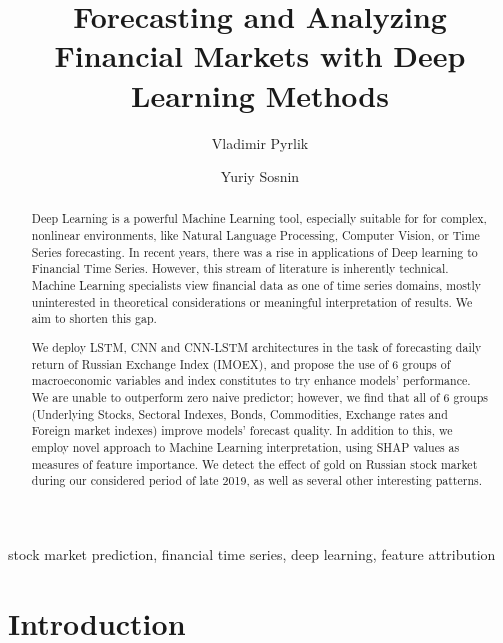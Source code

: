 \documentclass[review, authoryear]{elsarticle}
\begin{document}
\begin{frontmatter}

\title{Forecasting and Analyzing Financial Markets with Deep Learning Methods}

\author{Vladimir Pyrlik}
\address{HSE University}
\author{Yuriy Sosnin}
\address{HSE University}


\begin{abstract}

Deep Learning is a powerful Machine Learning tool, especially suitable for for complex, nonlinear environments, like Natural Language Processing, Computer Vision, or Time Series forecasting. In recent years, there was a rise in applications of Deep learning to Financial Time Series. However, this stream of literature is inherently technical. Machine Learning specialists view financial data as one of time series domains, mostly uninterested in theoretical considerations or meaningful interpretation of results. We aim to shorten this gap.

We deploy LSTM, CNN and CNN-LSTM architectures in the task of forecasting daily return of Russian Exchange Index (IMOEX), and propose the use of 6 groups of macroeconomic variables and index constitutes to try enhance models' performance. We are unable to outperform zero naive predictor; however, we find that all of 6 groups (Underlying Stocks, Sectoral Indexes, Bonds, Commodities, Exchange rates and Foreign market indexes) improve models' forecast quality.
In addition to this, we employ novel approach to Machine Learning interpretation, using SHAP values as measures of feature importance. We detect the effect of gold on Russian stock market during our considered period of late 2019, as well as several other interesting patterns.

\end{abstract}

\begin{keyword}
stock market prediction, financial time series, deep learning, feature attribution
\end{keyword}

\end{frontmatter}

\tableofcontents
\clearpage

\section{Introduction}
\end{document}
